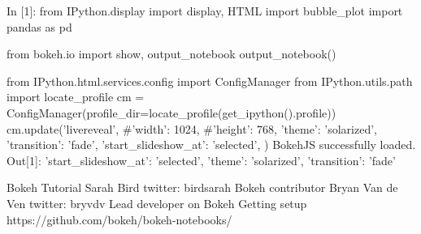 
In [1]:
from IPython.display import display, HTML
import bubble_plot
import pandas as pd

from bokeh.io import show, output_notebook
output_notebook()

from IPython.html.services.config import ConfigManager
from IPython.utils.path import locate_profile
cm = ConfigManager(profile_dir=locate_profile(get_ipython().profile))
cm.update('livereveal', {
              #'width': 1024,
              #'height': 768,
              'theme': 'solarized',
              'transition': 'fade',
              'start_slideshow_at': 'selected',
})
BokehJS successfully loaded.
Out[1]:
{'start_slideshow_at': 'selected', 'theme': 'solarized', 'transition': 'fade'}
 	
Bokeh Tutorial
Sarah Bird
twitter: birdsarah
Bokeh contributor
Bryan Van de Ven
twitter: bryvdv
Lead developer on Bokeh
Getting setup
https://github.com/bokeh/bokeh-notebooks/

